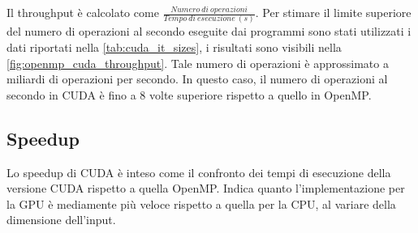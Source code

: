 \documentclass[12pt,a4paper]{report}
\begin{document}
\begin{figure}[H]
\end{figure}

Il throughput è calcolato come \(\frac{Numero\ di\ operazioni}{Tempo\ di\ esecuzione\ (s)}\).
Per stimare il limite superiore del numero di operazioni al secondo eseguite dai programmi sono stati utilizzati i dati riportati
nella \autoref{tab:cuda_it_sizes}, i risultati sono visibili nella \autoref{fig:openmp_cuda_throughput}.
Tale numero di operazioni è approssimato a miliardi di operazioni per secondo.
In questo caso, il numero di operazioni al secondo in CUDA è fino a 8 volte superiore rispetto a quello in OpenMP.

\subsection{Speedup}

Lo speedup di CUDA è inteso come il confronto dei tempi di esecuzione della versione CUDA rispetto a quella OpenMP.
Indica quanto l'implementazione per la GPU è mediamente più veloce rispetto a quella per la CPU, al variare della dimensione
dell'input.
\end{document}
